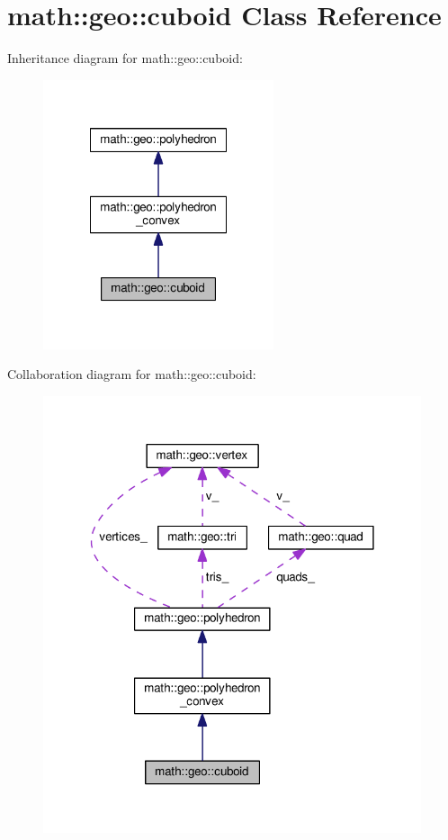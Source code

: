 \hypertarget{classmath_1_1geo_1_1cuboid}{\section{math\-:\-:geo\-:\-:cuboid Class Reference}
\label{classmath_1_1geo_1_1cuboid}
}


Inheritance diagram for math\-:\-:geo\-:\-:cuboid\-:
\nopagebreak
\begin{figure}[H]
\begin{center}
\leavevmode
\includegraphics[width=192pt]{classmath_1_1geo_1_1cuboid__inherit__graph}
\end{center}
\end{figure}


Collaboration diagram for math\-:\-:geo\-:\-:cuboid\-:
\nopagebreak
\begin{figure}[H]
\begin{center}
\leavevmode
\includegraphics[width=315pt]{classmath_1_1geo_1_1cuboid__coll__graph}
\end{center}
\end{figure}
